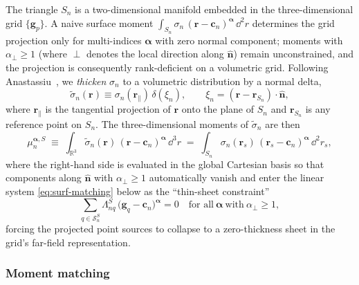 \documentclass[11pt,a4paper]{article}
\begin{document}
The triangle $S_n$ is a two-dimensional manifold embedded in the
three-dimensional grid $\{\bm{g}_p\}$. A naive surface moment
$\int_{S_n}\sigma_n\,(\bm{r}-\bm{c}_n)^{\bm{\alpha}}\,\dd^{2}r$
determines the grid projection only for multi-indices $\bm{\alpha}$
with zero normal component; moments with $\alpha_{\perp} \ge 1$ (where
$\perp$ denotes the local direction along $\hat{\bm{n}}$) remain
unconstrained, and the projection is consequently rank-deficient on a
volumetric grid. Following Anastassiu~\cite{Anastassiu1998}, we
\emph{thicken} $\sigma_n$ to a volumetric distribution by a normal
delta,
\begin{equation}
  \tilde{\sigma}_n(\bm{r})
    \equiv \sigma_n(\bm{r}_{\|})\,\delta(\xi_n),
  \qquad
  \xi_n = (\bm{r} - \bm{r}_{S_n})\!\cdot\!\hat{\bm{n}},
  \label{eq:thickening}
\end{equation}
where $\bm{r}_{\|}$ is the tangential projection of $\bm{r}$ onto the
plane of $S_n$ and $\bm{r}_{S_n}$ is any reference point on $S_n$. The
three-dimensional moments of $\tilde{\sigma}_n$ are then
\begin{equation}
  \mu_n^{\bm{\alpha},S}
    \;\equiv\; \int_{\mathbb{R}^{3}}
      \tilde{\sigma}_n(\bm{r})\,
      (\bm{r} - \bm{c}_n)^{\bm{\alpha}}\,\dd^{3}r
    \;=\; \int_{S_n}
      \sigma_n(\bm{r}_s)\,
      (\bm{r}_s - \bm{c}_n)^{\bm{\alpha}}\,\dd^{2}r_s,
  \label{eq:surf-moments}
\end{equation}
where the right-hand side is evaluated in the global Cartesian basis
so that components along $\hat{\bm{n}}$ with $\alpha_{\perp} \ge 1$
automatically vanish and enter the linear system
\eqref{eq:surf-matching} below as the ``thin-sheet constraint''
\begin{equation}
  \sum_{q\in\mathcal{S}^{S}_n}\Lambda^{S}_{nq}\,
    \bigl(\bm{g}_q - \bm{c}_n\bigr)^{\bm{\alpha}} = 0
  \quad\text{for all}\ \bm{\alpha}\ \text{with}\ \alpha_{\perp}\ge 1,
  \label{eq:thin-sheet}
\end{equation}
forcing the projected point sources to collapse to a zero-thickness
sheet in the grid's far-field representation.

\subsubsection*{Moment matching}
\end{document}
